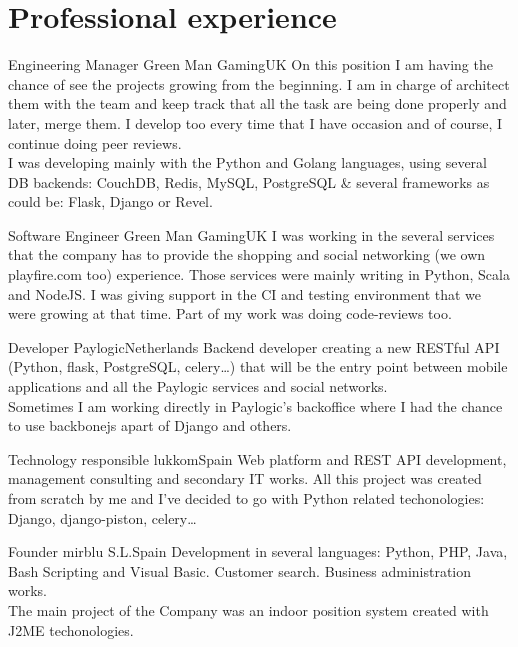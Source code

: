 \documentclass[10pt, a4paper]{moderncv}
\begin{document}
\maketitle


%
%

\section{Professional experience}
{Engineering Manager}
{Green Man Gaming}{UK}{}
{On this position I am having the chance of see the projects growing from the
beginning. I am in charge of architect them with the team and keep track that
all the task are being done properly and later, merge them. I develop too every
time that I have occasion and of course, I continue doing peer reviews.\\I was
developing mainly with the Python and Golang languages, using several DB
backends: CouchDB, Redis, MySQL, PostgreSQL \& several frameworks as could be:
Flask, Django or Revel.}

{Software Engineer}
{Green Man Gaming}{UK}{}
{I was working in the several services that the company has to provide the
shopping and social networking (we own playfire.com too) experience. Those
services were mainly writing in Python, Scala and NodeJS. I was giving support
in the CI and testing environment that we were growing at that time. Part of my
work was doing code-reviews too.}

{Developer}
{Paylogic}{Netherlands}{}
{Backend developer creating a new RESTful API (Python, flask, PostgreSQL,
celery\ldots) that will be the entry point between mobile applications and all
the Paylogic services and social networks.\\Sometimes I am working directly in
Paylogic's backoffice where I had the chance to use backbonejs apart of Django
and others.}

{Technology responsible}
{lukkom}{Spain}{}
{Web platform and REST API development, management consulting and secondary IT
works. All this project was created from scratch by me and I've decided to go
with Python related techonologies: Django, django-piston, celery\ldots}

{Founder}
{mirblu S.L.}{Spain}{}
{Development in several languages: Python, PHP, Java, Bash Scripting and Visual
Basic. Customer search. Business administration works.\\The main project of the
Company was an indoor position system created with J2ME techonologies.}
\end{document}
